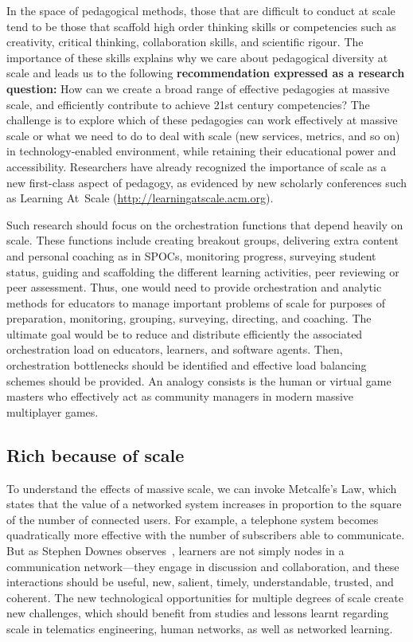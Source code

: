 In the space of pedagogical methods, those that are difficult to conduct
at scale tend to be those that scaffold high order thinking skills or
competencies such as creativity, critical thinking, collaboration
skills, and scientific rigour.  The importance of these skills explains
why we care about pedagogical diversity at scale and leads us to the
following \textbf{recommendation expressed as a research question:} How can we
create a broad range of effective pedagogies at massive scale, and
efficiently contribute to achieve 21st century competencies? The
challenge is to explore which of these pedagogies can work effectively
at massive scale or what we need to do to deal with scale (new services,
metrics, and so on) in technology-enabled environment, while retaining their
educational power and accessibility.  Researchers have already
recognized the importance of scale as a new first-class aspect of
pedagogy, as evidenced by new scholarly conferences such as Learning
At~Scale (\url{http://learningatscale.acm.org}).

Such research should focus on the orchestration functions that depend heavily
on scale. These functions include creating breakout groups, delivering
extra content and personal coaching as in SPOCs, monitoring progress,
surveying student status, guiding and scaffolding the different learning
activities, peer reviewing or peer assessment. Thus, one would need to
provide orchestration and analytic methods for educators to manage
important problems of scale for purposes of preparation, monitoring,
grouping, surveying, directing, and coaching. The ultimate goal would be
to reduce and distribute efficiently the associated orchestration load
on educators, learners, and software agents. Then, orchestration
bottlenecks should be identified and effective load balancing schemes
should be provided. An analogy consists is 
the human or virtual game masters who effectively act as community
managers in modern 
massive multiplayer games.

\subsection{Rich because of scale}

To understand the effects of massive scale, we can invoke
Metcalfe's Law, which states that the value of a networked system
increases in proportion to the square of the number of connected users.
For example, a telephone system becomes quadratically more 
effective with the number of subscribers able to communicate. But as
Stephen Downes observes~\cite{downes-personal-network-effect-2007},
learners are not simply nodes in a communication network---they engage
in discussion and collaboration, and these interactions should be
useful, new, salient, timely, understandable, trusted, and coherent. The
new technological opportunities for multiple degrees of scale create new
challenges, which should benefit from studies and lessons learnt
regarding scale in telematics engineering, human networks, as well as
networked learning.


